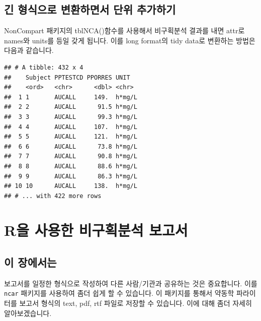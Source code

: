\documentclass[12pt,]{krantz}
\newenvironment{Shaded}{\begin{snugshade}}{\end{snugshade}}
\newcommand{\DataTypeTok}[1]{\textcolor[rgb]{0.13,0.29,0.53}{#1}}
\newcommand{\KeywordTok}[1]{\textcolor[rgb]{0.13,0.29,0.53}{\textbf{#1}}}
\newcommand{\NormalTok}[1]{#1}
\newcommand{\OperatorTok}[1]{\textcolor[rgb]{0.81,0.36,0.00}{\textbf{#1}}}
\newcommand{\StringTok}[1]{\textcolor[rgb]{0.31,0.60,0.02}{#1}}
\begin{document}
\hypertarget{long-format}{%
\section{긴 형식으로 변환하면서 단위 추가하기}\label{long-format}}

NonCompart 패키지의 tblNCA()함수를 사용해서 비구획분석 결과를 내면 attr로 names와 units를 등일 갖게 됩니다. 이를 long format의 tidy data로 변환하는 방법은 다음과 같습니다.

\begin{Shaded}
\end{Shaded}

\begin{verbatim}
## # A tibble: 432 x 4
##    Subject PPTESTCD PPORRES UNIT  
##    <ord>   <chr>      <dbl> <chr> 
##  1 1       AUCALL     149.  h*mg/L
##  2 2       AUCALL      91.5 h*mg/L
##  3 3       AUCALL      99.3 h*mg/L
##  4 4       AUCALL     107.  h*mg/L
##  5 5       AUCALL     121.  h*mg/L
##  6 6       AUCALL      73.8 h*mg/L
##  7 7       AUCALL      90.8 h*mg/L
##  8 8       AUCALL      88.6 h*mg/L
##  9 9       AUCALL      86.3 h*mg/L
## 10 10      AUCALL     138.  h*mg/L
## # ... with 422 more rows
\end{verbatim}

\hypertarget{ncar}{%
\chapter{R을 사용한 비구획분석 보고서}\label{ncar}}

\hypertarget{summary-ncar}{%
\section{이 장에서는}\label{summary-ncar}}

보고서를 일정한 형식으로 작성하여 다른 사람/기관과 공유하는 것은 중요합니다. 이를 \texttt{ncar} 패키지를 사용하여 좀더 쉽게 할 수 있습니다.
이 패키지를 통해서 약동학 파라이터를 보고서 형식의 text, pdf, rtf 파일로 저장할 수 있습니다.
이에 대해 좀더 자세히 알아보겠습니다.
\end{document}
